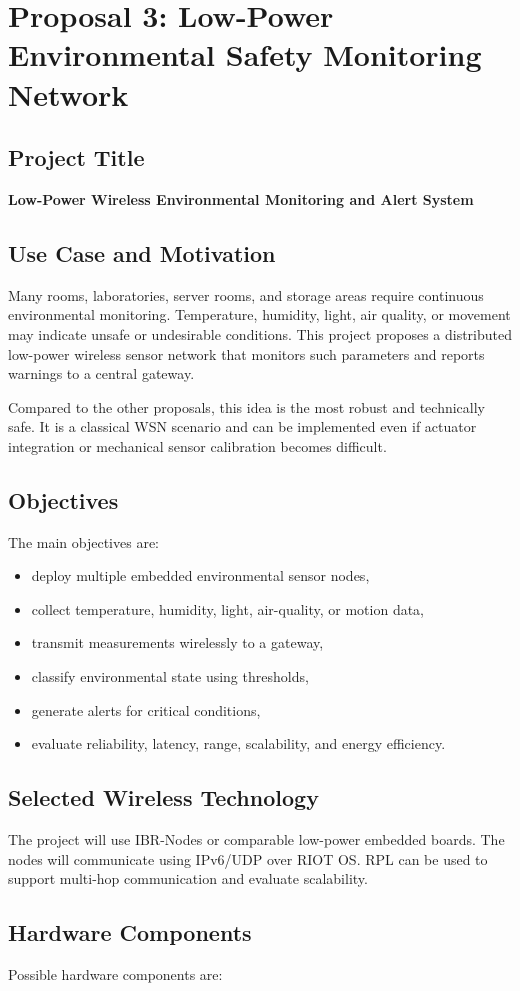 \documentclass[11pt,a4paper]{article}
\newcommand{\projecttitle}[1]{\subsection*{#1}}
\begin{document}
\newpage

\section{Proposal 3: Low-Power Environmental Safety Monitoring Network}

\projecttitle{Project Title}

\textbf{Low-Power Wireless Environmental Monitoring and Alert System}

\projecttitle{Use Case and Motivation}

Many rooms, laboratories, server rooms, and storage areas require continuous environmental monitoring. Temperature, humidity, light, air quality, or movement may indicate unsafe or undesirable conditions. This project proposes a distributed low-power wireless sensor network that monitors such parameters and reports warnings to a central gateway.

Compared to the other proposals, this idea is the most robust and technically safe. It is a classical WSN scenario and can be implemented even if actuator integration or mechanical sensor calibration becomes difficult.

\projecttitle{Objectives}

The main objectives are:

\begin{itemize}
    \item deploy multiple embedded environmental sensor nodes,
    \item collect temperature, humidity, light, air-quality, or motion data,
    \item transmit measurements wirelessly to a gateway,
    \item classify environmental state using thresholds,
    \item generate alerts for critical conditions,
    \item evaluate reliability, latency, range, scalability, and energy efficiency.
\end{itemize}

\projecttitle{Selected Wireless Technology}

The project will use IBR-Nodes or comparable low-power embedded boards. The nodes will communicate using IPv6/UDP over RIOT OS. RPL can be used to support multi-hop communication and evaluate scalability.

\projecttitle{Hardware Components}

Possible hardware components are:
\end{document}
